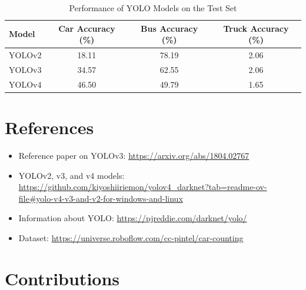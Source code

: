 \documentclass{article}
\begin{document}
\begin{table}[H]
    \centering
    \begin{tabular}{|l|c|c|c|}
    \hline
    \textbf{Model} & \textbf{Car Accuracy (\%)} & \textbf{Bus Accuracy (\%)} & \textbf{Truck Accuracy (\%)} \\
    \hline
    YOLOv2 & 18.11 & 78.19 & 2.06 \\
    \hline
    YOLOv3 & 34.57 & 62.55 & 2.06 \\
    \hline
    YOLOv4 & 46.50 & 49.79 & 1.65 \\
    \hline
    \end{tabular}
    \caption{Performance of YOLO Models on the Test Set}
    \label{tab:yolo_performance}
\end{table}


\section{References}
\begin{itemize}
    \item Reference paper on YOLOv3: \url{https://arxiv.org/abs/1804.02767}
    \item YOLOv2, v3, and v4 models: \url{https://github.com/kiyoshiiriemon/yolov4_darknet?tab=readme-ov-file#yolo-v4-v3-and-v2-for-windows-and-linux}
    \item Information about YOLO: \url{https://pjreddie.com/darknet/yolo/}
    \item Dataset: \url{https://universe.roboflow.com/cc-pintel/car-counting}
\end{itemize}

\section{Contributions}
\end{document}
